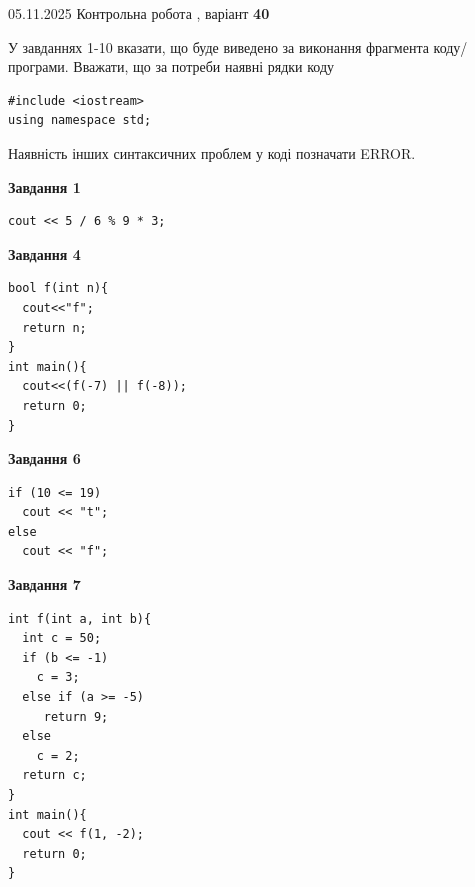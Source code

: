 \documentclass[12pt, ukrainian]{article}
\begin{document}
{\Large{05.11.2025 Контрольна робота , варіант  \No \textbf { 40 }\par}}
{
\begin {large}
У завданнях 1-10 вказати, що буде виведено за виконання фрагмента коду/про\-гра\-ми.
Вважати, що за потреби наявні рядки коду
\begin{verbatim}
#include <iostream>
using namespace std;
\end{verbatim}
Наявність інших синтаксичних проблем у коді позначати ERROR.

\begin{minipage}[t]{7.0cm}

\begin{center}
\textbf{Завдання 1}
\end{center}
\vspace{-8mm}

\begin{verbatim}
cout << 5 / 6 % 9 * 3;
\end{verbatim}



\begin{center}
\textbf{Завдання 4}
\end{center}
\vspace{-8mm}

\begin{verbatim}
bool f(int n){
  cout<<"f";
  return n;
}
int main(){
  cout<<(f(-7) || f(-8));
  return 0;
}
\end{verbatim}



\begin{center}
\textbf{Завдання 6}
\end{center}
\vspace{-8mm}

\begin{verbatim}
if (10 <= 19)
  cout << "t";
else
  cout << "f";
\end{verbatim}



\begin{center}
\textbf{Завдання 7}
\end{center}
\vspace{-8mm}

\begin{verbatim}
int f(int a, int b){
  int c = 50;
  if (b <= -1)
    c = 3;
  else if (a >= -5)
     return 9;
  else
    c = 2;
  return c;
}
int main(){
  cout << f(1, -2);
  return 0;
}
\end{verbatim}


\end{minipage}
\end{large}}
\end{document}
